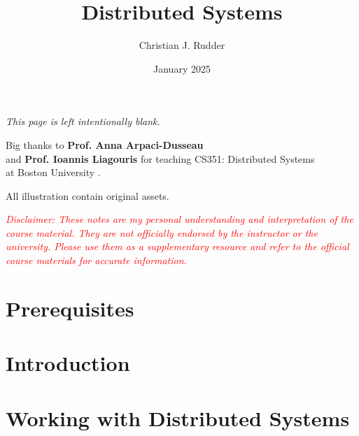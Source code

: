 \documentclass{memoir}
\title{Distributed Systems}
\author{Christian J. Rudder}
\date{January 2025}
\begin{document}
\maketitle
\setcounter{secnumdepth}{2}
\setcounter{tocdepth}{3}

\tableofcontents

\newpage
\thispagestyle{empty}
\mbox{}
\vfill
\begin{center}
    \textit{This page is left intentionally blank.}
\end{center}
\vfill
\newpage
\thispagestyle{empty}
\mbox{}
\vfill
\begin{center}
    \Large{Big thanks to \textbf{Prof. Anna Arpaci-Dusseau}}\\
    and  \textbf{Prof. Ioannis Liagouris}
    \normalsize 
    for teaching CS351: Distributed Systems\\
    at Boston University \cite{liagouris_cs351}.\\
\end{center}

\vfill

\begin{center}
    \noindent All illustration contain original assets.
\end{center}
    \begin{center}
        \textcolor{red}{\textit{Disclaimer: These notes are my personal understanding and interpretation of the course material. 
        They are not officially endorsed by the instructor or the university. Please use them as a supplementary resource and refer 
        to the official course materials for accurate information.}}
    \end{center}

    \chapter*{Prerequisites}
    
    
\chapter{Introduction}







\chapter{Working with Distributed Systems}
















\end{document}
